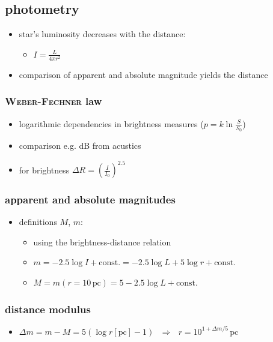 \documentclass[a4paper, 11pt]{article}
\begin{document}
    \subsection{photometry}
      \begin{itemize}
        \item star's luminosity decreases with the distance:
          \begin{itemize}
            \item $I=\frac{L}{4\pi r^2}$
          \end{itemize}
        \item comparison of apparent and absolute magnitude yields the distance
      \end{itemize}
      \subsubsection{\textsc{Weber-Fechner} law}
        \begin{itemize}
          \item logarithmic dependencies in brightness measures ($p=k\ln\frac{S}{S_0}$)
          \item comparison e.g. dB from acustics
          \item for brightness $\Delta R=\left(\frac{I}{I_0}\right)^{2.5}$
        \end{itemize}
      \subsubsection{apparent and absolute magnitudes}
        \begin{itemize}
          \item definitions $M$, $m$:
          \begin{itemize}
            \item using the brightness-distance relation
            \item $m=-2.5\log I+\mathrm{const.}=-2.5\log L+5\log r+\mathrm{const.}$
            \item $M=m\left(r=10\,\mathrm{pc}\right)=5-2.5\log L+\mathrm{const.}$
          \end{itemize}
        \end{itemize}
      \subsubsection{distance modulus}
        \begin{itemize}
          \item $\Delta m=m-M=5\left(\log r[\mathrm{pc}]-1\right) ~~~  \Rightarrow ~~~ r=10^{1+\Delta m/5}\,\mathrm{pc}$
        \end{itemize}
\end{document}
